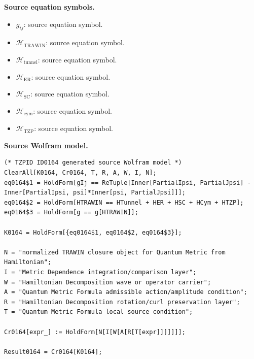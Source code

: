\begin{minipage}[t]{0.49\linewidth}
\begingroup
\small
\raggedright
\textbf{Source equation symbols.}\par
\begin{itemize}[leftmargin=1.35em,itemsep=1pt,topsep=1pt,parsep=0pt]
    \item $g_{ij}$: source equation symbol.
    \item $\mathcal{H}_{\mathrm{TRAWIN}}$: source equation symbol.
    \item $\mathcal{H}_{\mathrm{tunnel}}$: source equation symbol.
    \item $\mathcal{H}_{\mathrm{ER}}$: source equation symbol.
    \item $\mathcal{H}_{\mathrm{SC}}$: source equation symbol.
    \item $\mathcal{H}_{\mathrm{cym}}$: source equation symbol.
    \item $\mathcal{H}_{\mathrm{TZP}}$: source equation symbol.
\end{itemize}
\endgroup
\end{minipage}\hfill
\begin{minipage}[t]{0.47\linewidth}
\begingroup
\scriptsize
\raggedright
\textbf{Source Wolfram model.}\par
\begin{Verbatim}[fontsize=\tiny,breaklines=true,breakanywhere=true]
(* TZPID ID0164 generated source Wolfram model *)
ClearAll[K0164, Cr0164, T, R, A, W, I, N];
eq0164$1 = HoldForm[gIj == ReTuple[Inner[PartialIpsi, PartialJpsi] - Inner[PartialIpsi, psi]*Inner[psi, PartialJpsi]]];
eq0164$2 = HoldForm[HTRAWIN == HTunnel + HER + HSC + HCym + HTZP];
eq0164$3 = HoldForm[g == g[HTRAWIN]];

K0164 = HoldForm[{eq0164$1, eq0164$2, eq0164$3}];

N = "normalized TRAWIN closure object for Quantum Metric from Hamiltonian";
I = "Metric Dependence integration/comparison layer";
W = "Hamiltonian Decomposition wave or operator carrier";
A = "Quantum Metric Formula admissible action/amplitude condition";
R = "Hamiltonian Decomposition rotation/curl preservation layer";
T = "Quantum Metric Formula local source condition";

Cr0164[expr_] := HoldForm[N[I[W[A[R[T[expr]]]]]]];

Result0164 = Cr0164[K0164];
\end{Verbatim}
\endgroup
\end{minipage}

